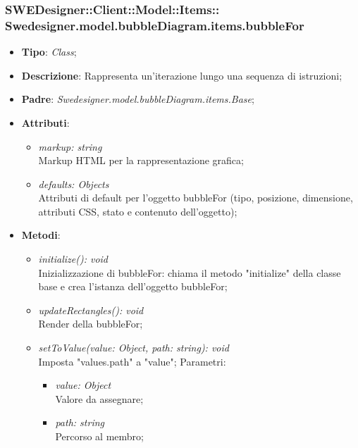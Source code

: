 \documentclass[../DefinizioneDiProdotto.tex]{subfiles}
\begin{document}
			\subsubsection[Swedesigner.model.bubbleDiagram.items.bubbleFor]{SWEDesigner::Client::Model::Items::\\Swedesigner.model.bubbleDiagram.items.bubbleFor}
			\hypertarget{SWEDesigner::Client::Model::Items::Swedesigner.model.bubbleDiagram.items.bubbleFor}{}
			\begin{itemize}
				\item \textbf{Tipo}: \emph{Class};
				\item \textbf{Descrizione}: Rappresenta un'iterazione lungo una sequenza di istruzioni;
				\item \textbf{Padre}: \emph{Swedesigner.model.bubbleDiagram.items.Base};
				\item \textbf{Attributi}:
				\begin{itemize}
					\item \emph{markup: string}\\
					Markup HTML per la rappresentazione grafica;
					\item \emph{defaults: Objects}\\
					Attributi di default per l'oggetto bubbleFor (tipo, posizione, dimensione, attributi CSS, stato e contenuto dell'oggetto);
				\end{itemize}
				\item \textbf{Metodi}:
				\begin{itemize}
					\item \emph{initialize(): void}\\
					Inizializzazione di bubbleFor: chiama il metodo "initialize" della classe base e crea l'istanza dell'oggetto bubbleFor;
					\item \emph{updateRectangles(): void}\\
					Render della bubbleFor;
					\item \emph{setToValue(value: Object, path: string): void}\\
					Imposta "values.path" a "value";
					Parametri:
					\begin{itemize}
						\item \emph{value: Object} \\
						Valore da assegnare;
						\item \emph{path: string} \\
						Percorso al membro;
					\end{itemize}
				\end{itemize}
			\end{itemize}
			
\end{document}
